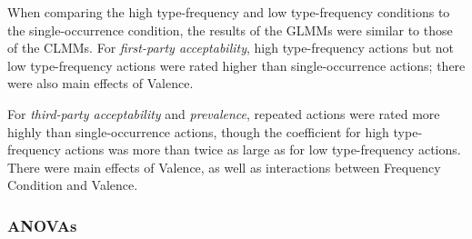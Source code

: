 \documentclass[
]{article}
\begin{document}
\begin{table}
\end{table}

When comparing the high type-frequency and low type-frequency conditions to the single-occurrence condition, the results of the GLMMs were similar to those of the CLMMs. For \emph{first-party acceptability}, high type-frequency actions but not low type-frequency actions were rated higher than single-occurrence actions; there were also main effects of Valence.

For \emph{third-party acceptability} and \emph{prevalence}, repeated actions were rated more highly than single-occurrence actions, though the coefficient for high type-frequency actions was more than twice as large as for low type-frequency actions. There were main effects of Valence, as well as interactions between Frequency Condition and Valence.

\subsubsection{ANOVAs}\label{anovas-2}
\end{document}
